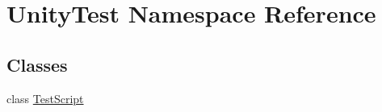 \hypertarget{namespace_unity_test}{}\section{Unity\+Test Namespace Reference}
\label{namespace_unity_test}
\subsection*{Classes}
\begin{DoxyCompactItemize}
\item 
class \mbox{\hyperlink{class_unity_test_1_1_test_script}{Test\+Script}}
\end{DoxyCompactItemize}
